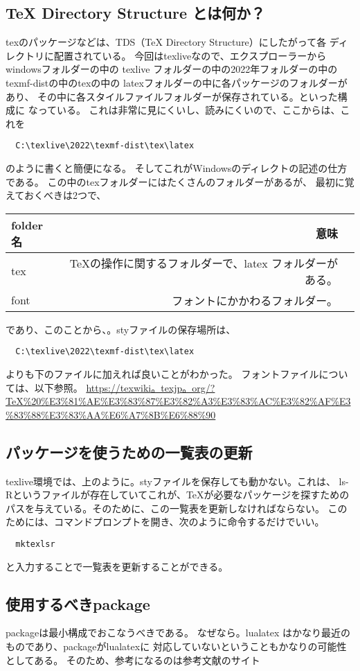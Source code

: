 \documentclass{ltjsarticle}
\begin{document}
\subsection{TeX Directory Structure とは何か？}
texのパッケージなどは、TDS（TeX Directory Structure）にしたがって各
ディレクトリに配置されている。
今回はtexliveなので、エクスプローラーからwindowsフォルダーの中の
texlive フォルダーの中の2022年フォルダーの中のtexmf-distの中のtexの中の
latexフォルダーの中に各パッケージのフォルダーがあり、
その中に各スタイルファイルフォルダーが保存されている。といった構成に
なっている。
これは非常に見にくいし、読みにくいので、ここからは、これを
\begin{verbatim}
  C:\texlive\2022\texmf-dist\tex\latex
\end{verbatim}
のように書くと簡便になる。
そしてこれがWindowsのディレクトの記述の仕方である。
この中のtexフォルダーにはたくさんのフォルダーがあるが、
最初に覚えておくべきは2つで、
\begin{center}
  \begin{tabular}{lrr} \hline
    folder名  & 意味                                \\ \hline
    tex       & TeXの操作に関するフォルダーで、latex フォルダーがある。  \\
    font      & フォントにかかわるフォルダー。                  \\ \hline
  \end{tabular}
\end{center}
であり、このことから、。styファイルの保存場所は、
\begin{verbatim}
  C:\texlive\2022\texmf-dist\tex\latex
\end{verbatim}
よりも下のファイルに加えれば良いことがわかった。
フォントファイルについては、以下参照。
\url{https://texwiki。texjp。org/?TeX%20%E3%81%AE%E3%83%87%E3%82%A3%E3%83%AC%E3%82%AF%E3%83%88%E3%83%AA%E6%A7%8B%E6%88%90}
\subsection{パッケージを使うための一覧表の更新}
texlive環境では、上のように。styファイルを保存しても動かない。これは、
ls-Rというファイルが存在していてこれが、TeXが必要なパッケージを探すための
パスを与えている。そのために、この一覧表を更新しなければならない。
このためには、コマンドプロンプトを開き、次のように命令するだけでいい。
\begin{verbatim}
  mktexlsr
\end{verbatim}
と入力することで一覧表を更新することができる。
\subsection{使用するべきpackage}
packageは最小構成でおこなうべきである。
なぜなら。lualatex  はかなり最近のものであり、packageがlualatexに
対応していないということもかなりの可能性としてある。
そのため、参考になるのは参考文献のサイト
\end{document}
